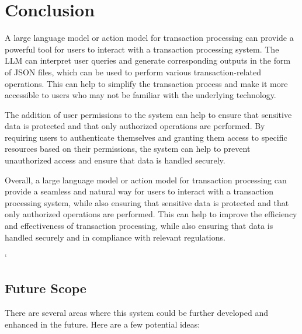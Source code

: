 \chapter{Conclusion}

\noindent A large language model or action model for transaction processing can provide a powerful tool for users to interact with a transaction processing system. The LLM can interpret user queries and generate corresponding outputs in the form of JSON files, which can be used to perform various transaction-related operations. This can help to simplify the transaction process and make it more accessible to users who may not be familiar with the underlying technology.

\noindent The addition of user permissions to the system can help to ensure that sensitive data is protected and that only authorized operations are performed. By requiring users to authenticate themselves and granting them access to specific resources based on their permissions, the system can help to prevent unauthorized access and ensure that data is handled securely.

\noindent Overall, a large language model or action model for transaction processing can provide a seamless and natural way for users to interact with a transaction processing system, while also ensuring that sensitive data is protected and that only authorized operations are performed. This can help to improve the efficiency and effectiveness of transaction processing, while also ensuring that data is handled securely and in compliance with relevant regulations.

\clearpage`
\section{Future Scope}

There are several areas where this system could be further developed and enhanced in the future. Here are a few potential ideas:

